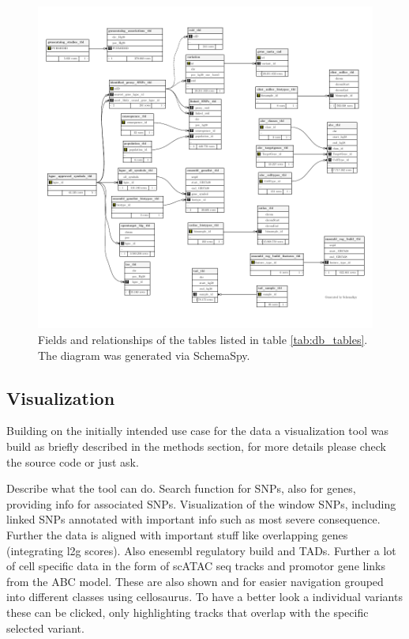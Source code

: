     \begin{figure}[h!]
    \capstart
        \centering
        \includegraphics{Abbildung/db-schema.pdf}

        \begin{minipage}{\captionwidth}
            \caption[database]{\newline
            Fields and relationships of the tables listed in table \ref{tab:db_tables}. The diagram was generated via SchemaSpy.}
            \label{fig:db_er}
        \end{minipage}
    \end{figure}



    \subsection{Visualization}
    \label{subsec:result_vis}
    Building on the initially intended use case for the data a visualization tool was build as briefly described in the methods section, for more details please check the source code or just ask.

    Describe what the tool can do. Search function for SNPs, also for genes, providing info for associated SNPs. Visualization of the window SNPs, including linked SNPs annotated with important info such as most severe consequence. Further the data is aligned with important stuff like overlapping genes (integrating l2g scores). Also enesembl regulatory build and TADs. Further a lot of cell specific data in the form of scATAC seq tracks and promotor gene links from the ABC model. These are also shown and for easier navigation grouped into different classes using cellosaurus. To have a better look a individual variants these can be clicked, only highlighting tracks that overlap with the specific selected variant.

